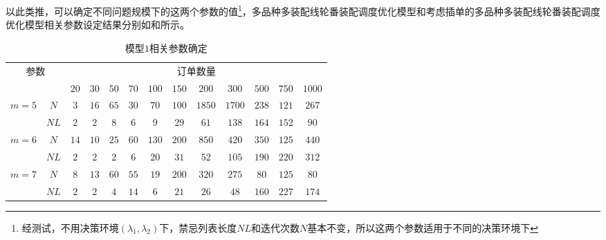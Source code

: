 以此类推，可以确定不同问题规模下的这两个参数的值\footnote{经测试，不用决策环境$(\lambda_1, \lambda_2)$下，禁忌列表长度$NL$和迭代次数$N$基本不变，所以这两个参数适用于不同的决策环境下}，多品种多装配线轮番装配调度优化模型和考虑插单的多品种多装配线轮番装配调度优化模型相关参数设定结果分别如和所示。
\begin{table}[h]
\centering
\caption{模型$1$相关参数确定}
\begin{tabular}{ccccccccccccc}
\toprule
\multicolumn{2}{c}{\multirow{2}[0]{*}{参数}} & \multicolumn{11}{c}{订单数量} \\
\multicolumn{2}{c}{}		  & $20 $   & $30$    & $50$    & $70$    & $100$   & $150 $  & $200$   & $300$   & $500$   & $750$   & $1000$ \\
\midrule
\multirow{2}[0]{*}{$m=5$}&$N$& $3$     & $16$    & $65$    & $30$    & $70$    & $100$   & $1850$   & $1700$  & $238$  & $121$   & $267$ \\
     			  & $NL$&   $2$    & $2$     & $8$      & $6$      & $9$      & $29$     & $61$     & $138$    & $164$    & $152$   & $90$ \\
\multirow{2}[0]{*}{$m=6$}&$N$& $14$    & $10$    & $25$    & $60$    & $130$   & $200$   & $850$   & $420$    &  $350 $   &  $125 $ &$440$  \\
		            & $NL$ & $2$     & $2$      & $2$      & $6$      & $20$     & $31$     & $52$     & $105$   & $190$    & $220$   & $312$ \\
\multirow{2}[0]{*}{$m=7$}& $N$& $8$     & $13$    &$ 60    $&$ 55    $ &$ 19    $&$ 200   $&$ 320   $&$ 275   $&$80     $   & $   125  $&$80  $\\
 		          &$ NL    $&$ 2     $&$ 2     $&$ 4     $&$ 14   $  &  $6     $  &  $21 $ &$ 26   $  &$ 48    $&$ 160   $   &$ 227   $&$ 174 $\\
\bottomrule
\end{tabular}
\label{tab:model1para}
\end{table}

